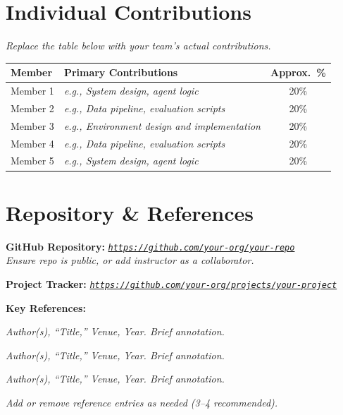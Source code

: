 \documentclass[11pt, letterpaper]{article}
\newcommand{\placeholder}[1]{\textcolor{placeholder}{\textit{#1}}}
\begin{document}
\section{Individual Contributions}
\begin{tcolorbox}[sectionbox, height=4.3cm, valign=top]
  \placeholder{Replace the table below with your team's actual contributions.}

  \vspace{4pt}
  \centering
  \begin{tabularx}{0.95\textwidth}{l X c}
    \toprule
    \textbf{Member} & \textbf{Primary Contributions} & \textbf{Approx.\ \%} \\
    \midrule
    Member 1 & \placeholder{e.g., System design, agent logic}          & 20\% \\
    Member 2 & \placeholder{e.g., Data pipeline, evaluation scripts}   & 20\% \\
    Member 3 & \placeholder{e.g., Environment design and implementation} & 20\% \\
    Member 4 & \placeholder{e.g., Data pipeline, evaluation scripts}  & 20\% \\
    Member 5 & \placeholder{e.g., System design, agent logic}  & 20\% \\
    \bottomrule
  \end{tabularx}
\end{tcolorbox}

\section{Repository \& References}
\begin{tcolorbox}[sectionbox, height=4.5cm, valign=top]
  \textbf{GitHub Repository:}
  \placeholder{\href{https://github.com/your-org/your-repo}%
       {\texttt{https://github.com/your-org/your-repo}}}\\
    \placeholder{Ensure repo is public, or add instructor as a collaborator.}\vspace{1pt}

  \textbf{Project Tracker:} \placeholder{\href{https://github.com/your-org/your-repo}{\texttt{https://github.com/your-org/projects/your-project}}}

  \vspace{6pt}
  \textbf{Key References:}
  \begin{enumerate}[leftmargin=1.4em, itemsep=1pt, topsep=2pt, label={[\arabic*]}]
    \item \placeholder{Author(s), ``Title,'' Venue, Year. Brief annotation.}
    \item \placeholder{Author(s), ``Title,'' Venue, Year. Brief annotation.}
    \item \placeholder{Author(s), ``Title,'' Venue, Year. Brief annotation.}
  \end{enumerate}

  \vspace{4pt}
  \placeholder{Add or remove reference entries as needed (3--4 recommended).}
\end{tcolorbox}
\end{document}
